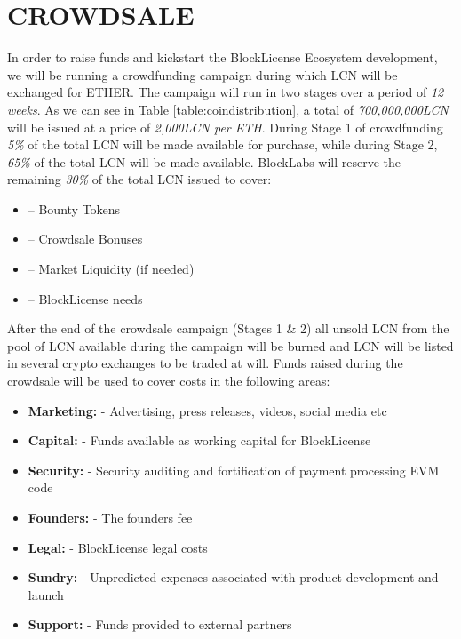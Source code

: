\newpage
\section{CROWDSALE} \label{crowdsale}

In order to raise funds and kickstart the BlockLicense Ecosystem development, we will be running a crowdfunding campaign during which LCN will be exchanged for ETHER. The campaign will run in two stages over a period of \textit{12 weeks}. As we can see in Table \ref{table:coindistribution}, a total of \textit{700,000,000LCN} will be issued at a price of \textit{2,000LCN per ETH}. During Stage 1 of crowdfunding \textit{5\%} of the total LCN will be made available for purchase, while during Stage 2, \textit{65\%} of the total LCN will be made available. 
\newline
\bigskip
BlockLabs will reserve the remaining \textit{30\%} of the total LCN issued to cover:

\begin{itemize}
\item -- Bounty Tokens
\item -- Crowdsale Bonuses
\item -- Market Liquidity (if needed)
\item -- BlockLicense needs
\end{itemize}

After the end of the crowdsale campaign (Stages 1 \& 2) all unsold LCN from the pool of LCN available during the campaign will be burned and LCN will be listed in several crypto exchanges to be traded at will.
\newline
\bigskip
Funds raised during the crowdsale will be used to cover costs in the following areas:

\begin{itemize}
\item \textbf{Marketing:} - Advertising, press releases, videos, social media etc
\item \textbf{Capital:} - Funds available as working capital for BlockLicense
\item \textbf{Security:} - Security auditing and fortification of payment processing EVM code
\item \textbf{Founders:} - The founders fee
\item \textbf{Legal:} - BlockLicense legal costs
\item \textbf{Sundry:} - Unpredicted expenses associated with product development and launch
\item \textbf{Support:} - Funds provided to external partners
\end{itemize}

